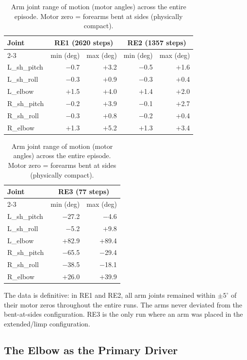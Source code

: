 \documentclass[11pt,a4paper]{article}
\newcommand{\re}[1]{\textcolor{red3}{\textbf{#1}}}
\newcommand{\good}[1]{\textcolor{blue2}{\textbf{#1}}}
\begin{document}
\begin{table}[H]
\centering
\caption{Arm joint range of motion (motor angles) across the entire episode.
         Motor zero = forearms bent at sides (physically compact).}
\label{tab:arm_range}
\begin{tabular}{lrrrr}
\toprule
Joint & \multicolumn{2}{c}{\good{RE1 (2620 steps)}} &
        \multicolumn{2}{c}{\good{RE2 (1357 steps)}} \\
\cmidrule{2-3}\cmidrule{4-5}
      & min (deg) & max (deg) & min (deg) & max (deg) \\
\midrule
L\_sh\_pitch & $-$0.7 & $+$3.2 & $-$0.5 & $+$1.6 \\
L\_sh\_roll  & $-$0.3 & $+$0.9 & $-$0.3 & $+$0.4 \\
L\_elbow     & $+$1.5 & $+$4.0 & $+$1.4 & $+$2.0 \\
R\_sh\_pitch & $-$0.2 & $+$3.9 & $-$0.1 & $+$2.7 \\
R\_sh\_roll  & $-$0.3 & $+$0.8 & $-$0.2 & $+$0.4 \\
R\_elbow     & $+$1.3 & $+$5.2 & $+$1.3 & $+$3.4 \\
\bottomrule
\end{tabular}
\medskip

\begin{tabular}{lrr}
\toprule
Joint & \multicolumn{2}{c}{\re{RE3 (77 steps)}} \\
\cmidrule{2-3}
 & min (deg) & max (deg) \\
\midrule
L\_sh\_pitch & $-$27.2 & $-$4.6 \\
L\_sh\_roll  & $-$5.2 & $+$9.8 \\
L\_elbow     & $+$82.9 & $+$89.4 \\
R\_sh\_pitch & $-$65.5 & $-$29.4 \\
R\_sh\_roll  & $-$38.5 & $-$18.1 \\
R\_elbow     & $+$26.0 & $+$39.9 \\
\bottomrule
\end{tabular}
\end{table}

The data is definitive: in RE1 and RE2, all arm joints remained within
$\pm 5^\circ$ of their motor zeros throughout the entire runs.  The arms
never deviated from the bent-at-sides configuration.  RE3 is the only run
where an arm was placed in the extended/limp configuration.

\subsection{The Elbow as the Primary Driver}
\end{document}
